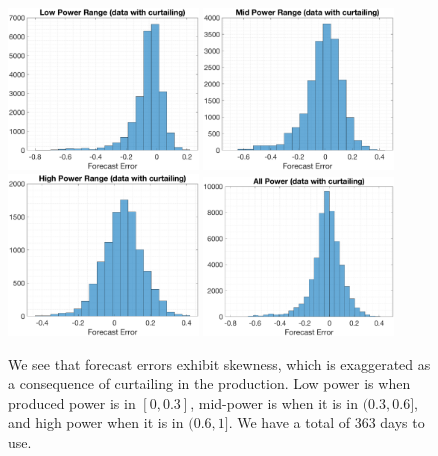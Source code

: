 \documentclass[11pt]{article}
\theoremstyle{definition}
\begin{document}
\begin{figure}[H]
\centering
\includegraphics[width=0.45\textwidth]{plots/LP_6.eps}
\includegraphics[width=0.45\textwidth]{plots/MP_6.eps}\\
\includegraphics[width=0.45\textwidth]{plots/HP_6.eps}
\includegraphics[width=0.45\textwidth]{plots/AP_6.eps}
\caption{We see that forecast errors exhibit skewness, which is exaggerated as a consequence of curtailing in the production. Low power is when produced power is in $[0,0.3]$, mid-power is when it is in $(0.3,0.6]$, and high power when it is in $(0.6,1]$. We have a total of 363 days to use.}
  \label{fig:data_curtailing}
\end{figure}
\end{document}
